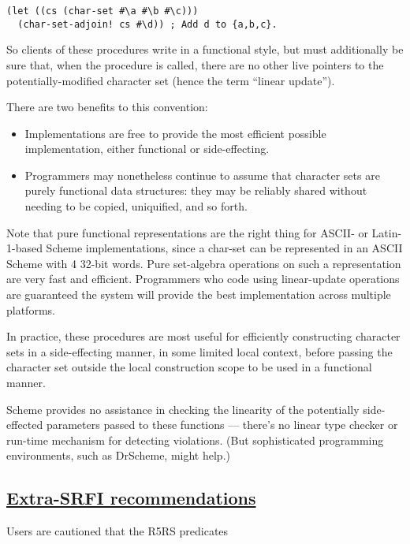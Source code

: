\begin{verbatim}
(let ((cs (char-set #\a #\b #\c)))
  (char-set-adjoin! cs #\d)) ; Add d to {a,b,c}.
\end{verbatim}

So clients of these procedures write in a functional style, but must
additionally be sure that, when the procedure is called, there are no
other live pointers to the potentially-modified character set (hence the
term ``linear update'').

There are two benefits to this convention:

\begin{itemize}
\tightlist
\item
  Implementations are free to provide the most efficient possible
  implementation, either functional or side-effecting.
\item
  Programmers may nonetheless continue to assume that character sets are
  purely functional data structures: they may be reliably shared without
  needing to be copied, uniquified, and so forth.
\end{itemize}

Note that pure functional representations are the right thing for ASCII-
or Latin-1-based Scheme implementations, since a char-set can be
represented in an ASCII Scheme with 4 32-bit words. Pure set-algebra
operations on such a representation are very fast and efficient.
Programmers who code using linear-update operations are guaranteed the
system will provide the best implementation across multiple platforms.

In practice, these procedures are most useful for efficiently
constructing character sets in a side-effecting manner, in some limited
local context, before passing the character set outside the local
construction scope to be used in a functional manner.

Scheme provides no assistance in checking the linearity of the
potentially side-effected parameters passed to these functions ---
there's no linear type checker or run-time mechanism for detecting
violations. (But sophisticated programming environments, such as
DrScheme, might help.)

\subsection{\texorpdfstring{\href{}{Extra-SRFI
recommendations}}{Extra-SRFI recommendations}}\label{extra-srfi-recommendations}

Users are cautioned that the R5RS predicates

